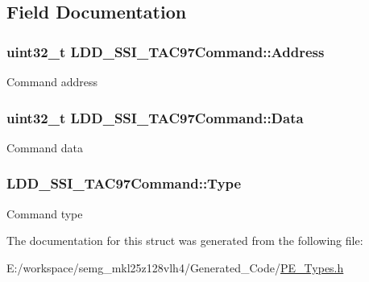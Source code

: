 \subsection{Field Documentation}
\hypertarget{struct_l_d_d___s_s_i___t_a_c97_command_a0d39df5cae85e73b036af81e9fbc6332}{
\subsubsection[{Address}]{\setlength{\rightskip}{0pt plus 5cm}uint32\-\_\-t L\-D\-D\-\_\-\-S\-S\-I\-\_\-\-T\-A\-C97\-Command\-::\-Address}}\label{struct_l_d_d___s_s_i___t_a_c97_command_a0d39df5cae85e73b036af81e9fbc6332}
Command address \hypertarget{struct_l_d_d___s_s_i___t_a_c97_command_abc16535d09d61f2c3f885adf91632117}{
\subsubsection[{Data}]{\setlength{\rightskip}{0pt plus 5cm}uint32\-\_\-t L\-D\-D\-\_\-\-S\-S\-I\-\_\-\-T\-A\-C97\-Command\-::\-Data}}\label{struct_l_d_d___s_s_i___t_a_c97_command_abc16535d09d61f2c3f885adf91632117}
Command data \hypertarget{struct_l_d_d___s_s_i___t_a_c97_command_ac7226beaf57a764f71faf7e822e27a6e}{
\subsubsection[{Type}]{ L\-D\-D\-\_\-\-S\-S\-I\-\_\-\-T\-A\-C97\-Command\-::\-Type}}\label{struct_l_d_d___s_s_i___t_a_c97_command_ac7226beaf57a764f71faf7e822e27a6e}
Command type 

The documentation for this struct was generated from the following file\-:\begin{DoxyCompactItemize}
\item 
E\-:/workspace/semg\-\_\-mkl25z128vlh4/\-Generated\-\_\-\-Code/\hyperlink{_p_e___types_8h}{P\-E\-\_\-\-Types.\-h}\end{DoxyCompactItemize}
